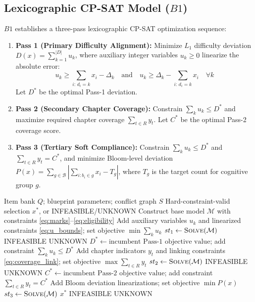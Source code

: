 \documentclass[runningheads]{llncs}
\begin{document}
\subsection{Lexicographic CP-SAT Model ($B1$)}
$B1$ establishes a three-pass lexicographic CP-SAT optimization sequence:
\begin{enumerate}
    \item \textbf{Pass 1 (Primary Difficulty Alignment):} Minimize $L_1$ difficulty deviation $D(x) = \sum_{k=1}^{|D|} u_k$, where auxiliary integer variables $u_k \ge 0$ linearize the absolute error:
    \begin{equation}
    u_k \ge \sum_{i:\,d_i=k} x_i - \Delta_k \quad \text{and} \quad u_k \ge \Delta_k - \sum_{i:\,d_i=k} x_i \quad \forall k \label{eq:u_bounds}
    \end{equation}
    Let $D^*$ be the optimal Pass-1 deviation.
    \item \textbf{Pass 2 (Secondary Chapter Coverage):} Constrain $\sum_k u_k \le D^*$ and maximize required chapter coverage $\sum_{t\in R} y_t$. Let $C^*$ be the optimal Pass-2 coverage score.
    \item \textbf{Pass 3 (Tertiary Soft Compliance):} Constrain $\sum_k u_k \le D^*$ and $\sum_{t\in R} y_t = C^*$, and minimize Bloom-level deviation $P(x) = \sum_{g\in\mathcal{B}} | \sum_{i:b_i\in g} x_i - T_g |$, where $T_g$ is the target count for cognitive group $g$.
\end{enumerate}

\begin{algorithm}[t]
\caption{Three-pass lexicographic CP-SAT solver ($B1$)}
\label{alg:threepass}
\begin{algorithmic}[1]
\Require Item bank $Q$; blueprint parameters; conflict graph $S$
\Ensure Hard-constraint-valid selection $x^*$, or INFEASIBLE/UNKNOWN
\State Construct base model $\mathcal{M}$ with constraints \eqref{eq:marks}--\eqref{eq:eligibility}
\State Add auxiliary variables $u_k$ and linearized constraints \eqref{eq:u_bounds}; set objective $\min \sum_k u_k$
\State $st_1 \gets \textsc{Solve}(\mathcal{M})$
 \Return INFEASIBLE \EndIf
{} \Return UNKNOWN \EndIf
\State $D^* \gets \text{incumbent Pass-1 objective value}$; add constraint $\sum_k u_k \le D^*$
\State Add chapter indicators $y_t$ and linking constraints \eqref{eq:coverage_link}; set objective $\max \sum_{t\in R} y_t$
\State $st_2 \gets \textsc{Solve}(\mathcal{M})$
 \Return INFEASIBLE \EndIf
{} \Return UNKNOWN \EndIf
\State $C^* \gets \text{incumbent Pass-2 objective value}$; add constraint $\sum_{t\in R} y_t = C^*$
\State Add Bloom deviation linearizations; set objective $\min P(x)$
\State $st_3 \gets \textsc{Solve}(\mathcal{M})$
 \Return $x^*$ \EndIf
{} \Return INFEASIBLE \EndIf
\Return UNKNOWN
\end{algorithmic}
\end{algorithm}
\end{document}
